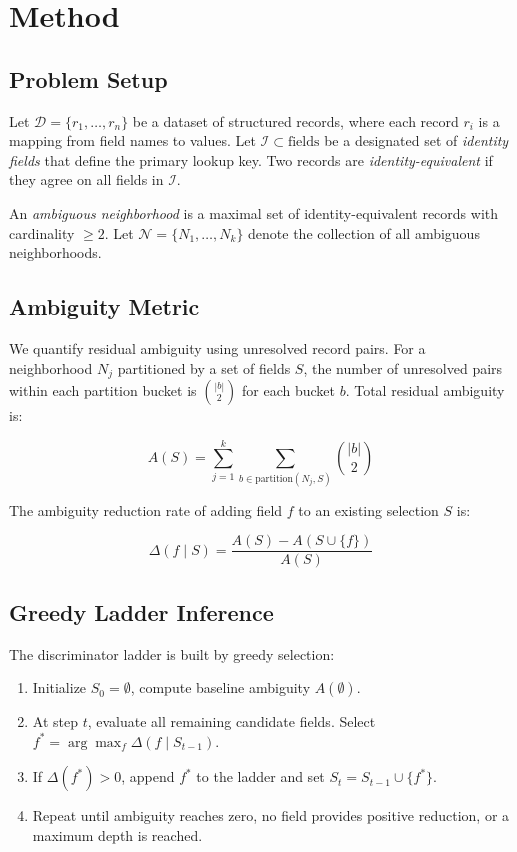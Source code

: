 \documentclass[11pt]{article}
\begin{document}
\section{Method}

\subsection{Problem Setup}

Let $\mathcal{D} = \{r_1, \ldots, r_n\}$ be a dataset of structured records, where each record $r_i$ is a mapping from field names to values. Let $\mathcal{I} \subset \text{fields}$ be a designated set of \textit{identity fields} that define the primary lookup key. Two records are \textit{identity-equivalent} if they agree on all fields in $\mathcal{I}$.

An \textit{ambiguous neighborhood} is a maximal set of identity-equivalent records with cardinality $\geq 2$. Let $\mathcal{N} = \{N_1, \ldots, N_k\}$ denote the collection of all ambiguous neighborhoods.

\subsection{Ambiguity Metric}

We quantify residual ambiguity using unresolved record pairs. For a neighborhood $N_j$ partitioned by a set of fields $S$, the number of unresolved pairs within each partition bucket is $\binom{|b|}{2}$ for each bucket $b$. Total residual ambiguity is:

\begin{equation}
A(S) = \sum_{j=1}^{k} \sum_{b \in \text{partition}(N_j, S)} \binom{|b|}{2}
\end{equation}

The ambiguity reduction rate of adding field $f$ to an existing selection $S$ is:

\begin{equation}
\Delta(f \mid S) = \frac{A(S) - A(S \cup \{f\})}{A(S)}
\end{equation}

\subsection{Greedy Ladder Inference}

The discriminator ladder is built by greedy selection:

\begin{enumerate}
\item Initialize $S_0 = \emptyset$, compute baseline ambiguity $A(\emptyset)$.
\item At step $t$, evaluate all remaining candidate fields. Select $f^* = \arg\max_f \Delta(f \mid S_{t-1})$.
\item If $\Delta(f^*) > 0$, append $f^*$ to the ladder and set $S_t = S_{t-1} \cup \{f^*\}$.
\item Repeat until ambiguity reaches zero, no field provides positive reduction, or a maximum depth is reached.
\end{enumerate}
\end{document}
